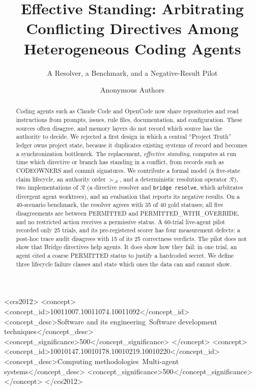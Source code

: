 \documentclass[sigconf,review,anonymous]{acmart}
\newcommand{\succA}{\succ_{\mathcal{A}}}
\newcommand{\Res}{\mathcal{R}}
\newcommand{\sP}{\textsf{PERMITTED}}
\newcommand{\sPWO}{\textsf{PERMITTED\_\allowbreak WITH\_\allowbreak OVERRIDE}}
\begin{document}
\title{Effective Standing: Arbitrating Conflicting Directives Among Heterogeneous Coding Agents}
\subtitle{A Resolver, a Benchmark, and a Negative-Result Pilot}

\author{Anonymous Authors}

\begin{abstract}
Coding agents such as Claude Code and OpenCode now share repositories and read instructions from prompts, issues, rule files, documentation, and configuration. These sources often disagree, and memory layers do not record which source has the authority to decide. We rejected a first design in which a central ``Project Truth'' ledger owns project state, because it duplicates existing systems of record and becomes a synchronization bottleneck. The replacement, \emph{effective standing}, computes at run time which directive or branch has standing in a conflict, from records such as CODEOWNERS and commit signatures. We contribute a formal model (a five-state claim lifecycle, an authority order $\succA$, and a deterministic resolution operator $\Res$), two implementations of $\Res$ (a directive resolver and \texttt{bridge resolve}, which arbitrates divergent agent worktrees), and an evaluation that reports its negative results. On a 40-scenario benchmark, the resolver agrees with 35 of 40 gold statuses; all five disagreements are between \sP{} and \sPWO{}, and no restricted action receives a permissive status. A 60-trial live-agent pilot recorded only 25 trials, and its pre-registered scorer has four measurement defects: a post-hoc trace audit disagrees with 15 of its 25 correctness verdicts. The pilot does not show that Bridge directives help agents. It does show how they fail: in one trial, an agent cited a coarse \sP{} status to justify a hardcoded secret. We define three lifecycle failure classes and state which ones the data can and cannot show.
\end{abstract}

\begin{CCSXML}
<ccs2012>
   <concept>
       <concept_id>10011007.10011074.10011092</concept_id>
       <concept_desc>Software and its engineering~Software development techniques</concept_desc>
       <concept_significance>500</concept_significance>
       </concept>
   <concept>
       <concept_id>10010147.10010178.10010219.10010220</concept_id>
       <concept_desc>Computing methodologies~Multi-agent systems</concept_desc>
       <concept_significance>500</concept_significance>
       </concept>
 </ccs2012>
\end{CCSXML}
\end{document}
